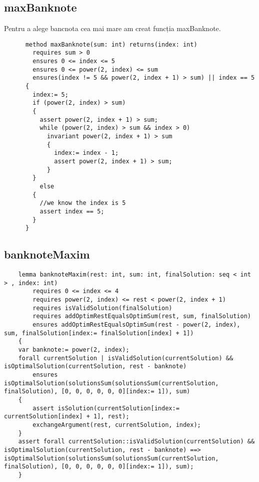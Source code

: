     \subsection{maxBanknote}
    Pentru a alege bancnota cea mai mare am creat funcția maxBanknote.\par
    \begin{lstlisting}
      method maxBanknote(sum: int) returns(index: int)
        requires sum > 0
        ensures 0 <= index <= 5
        ensures 0 <= power(2, index) <= sum
        ensures(index != 5 && power(2, index + 1) > sum) || index == 5 
      {
        index:= 5;
        if (power(2, index) > sum) 
        {
          assert power(2, index + 1) > sum;
          while (power(2, index) > sum && index > 0)
            invariant power(2, index + 1) > sum 
            {
              index:= index - 1;
              assert power(2, index + 1) > sum;
            }
        } 
          else 
        {
          //we know the index is 5
          assert index == 5;
        }
      }
    \end{lstlisting}


    \subsection{banknoteMaxim}
    \begin{lstlisting}
    lemma banknoteMaxim(rest: int, sum: int, finalSolution: seq < int > , index: int)
        requires 0 <= index <= 4
        requires power(2, index) <= rest < power(2, index + 1)
        requires isValidSolution(finalSolution)
        requires addOptimRestEqualsOptimSum(rest, sum, finalSolution)
        ensures addOptimRestEqualsOptimSum(rest - power(2, index), sum, finalSolution[index:= finalSolution[index] + 1]) 
    {
    var banknote:= power(2, index);
    forall currentSolution | isValidSolution(currentSolution) && isOptimalSolution(currentSolution, rest - banknote)
        ensures isOptimalSolution(solutionsSum(solutionsSum(currentSolution, finalSolution), [0, 0, 0, 0, 0, 0][index:= 1]), sum) 
    {
        assert isSolution(currentSolution[index:= currentSolution[index] + 1], rest);
        exchangeArgument(rest, currentSolution, index);
    }
    assert forall currentSolution::isValidSolution(currentSolution) && isOptimalSolution(currentSolution, rest - banknote) ==> isOptimalSolution(solutionsSum(solutionsSum(currentSolution, finalSolution), [0, 0, 0, 0, 0, 0][index:= 1]), sum);
    }
    \end{lstlisting}

